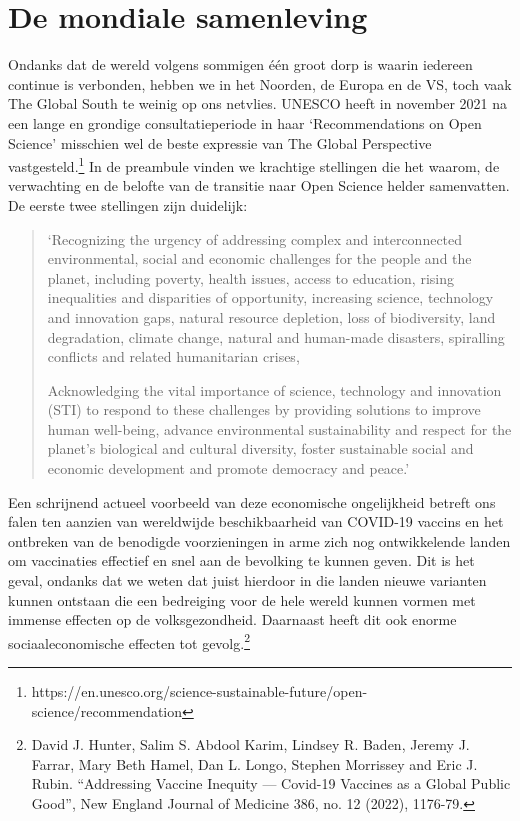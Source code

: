 \documentclass{jote-book}
\begin{document}
	\section{De mondiale samenleving}



	Ondanks dat de wereld volgens sommigen één groot dorp is waarin iedereen continue is verbonden, hebben we in het Noorden, de Europa en de VS, toch vaak The Global South te weinig op ons netvlies. UNESCO heeft in november 2021 na een lange en grondige consultatieperiode in haar ‘Recommendations on Open Science' misschien wel de beste expressie van The Global Perspective vastgesteld.\footnote{https://en.unesco.org/science-sustainable-future/open-science/recommendation} In de preambule vinden we krachtige stellingen die het waarom, de verwachting en de belofte van de transitie naar Open Science helder samenvatten. De eerste twee stellingen zijn duidelijk:

	\begin{quote}
		\itshape

		‘Recognizing the urgency of addressing complex and interconnected environmental, social and economic challenges for the people and the planet, including poverty, health issues, access to education, rising inequalities and disparities of opportunity, increasing science, technology and innovation gaps, natural resource depletion, loss of biodiversity, land degradation, climate change, natural and human-made disasters, spiralling conflicts and related humanitarian crises,

		Acknowledging the vital importance of science, technology and innovation (STI) to respond to these challenges by providing solutions to improve human well-being, advance environmental sustainability and respect for the planet's biological and cultural diversity, foster sustainable social and economic development and promote democracy and peace.'
	\end{quote}

	Een schrijnend actueel voorbeeld van deze economische ongelijkheid betreft ons falen ten aanzien van wereldwijde beschikbaarheid van COVID-19 vaccins en het ontbreken van de benodigde voorzieningen in arme zich nog ontwikkelende landen om vaccinaties effectief en snel aan de bevolking te kunnen geven. Dit is het geval, ondanks dat we weten dat juist hierdoor in die landen nieuwe varianten kunnen ontstaan die een bedreiging voor de hele wereld kunnen vormen met immense effecten op de volksgezondheid. Daarnaast heeft dit ook enorme sociaaleconomische effecten tot gevolg.\footnote{David J. Hunter, Salim S. Abdool Karim, Lindsey R. Baden, Jeremy J. Farrar, Mary Beth Hamel, Dan L. Longo, Stephen Morrissey and Eric J. Rubin. “Addressing Vaccine Inequity — Covid-19 Vaccines as a Global Public Good”, New England Journal of Medicine 386, no. 12 (2022), 1176-79. }
\end{document}
